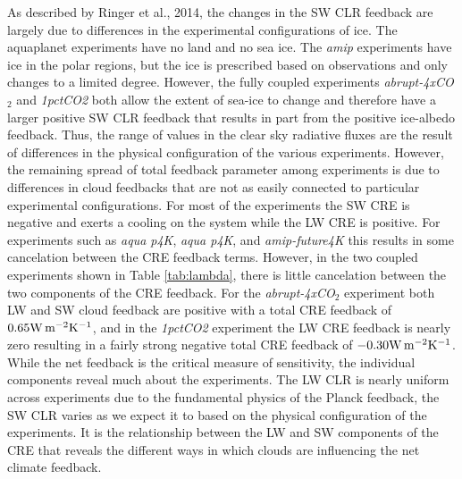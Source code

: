 \documentclass[draft]{agujournal2019}
\begin{document}
As described by Ringer et al., 2014, the changes in the SW CLR feedback are largely due to differences 
in the experimental configurations of ice.  The aquaplanet experiments have no land and no sea ice.  
The \textit{amip} experiments have ice in the polar regions, but the ice is prescribed based on observations and 
only changes to a limited degree.  However, the fully coupled experiments \textit{abrupt-4xCO$_2$} and 
\textit{1pctCO2} both allow the extent of sea-ice to change and therefore have a larger positive SW CLR
feedback that results in part from the positive ice-albedo feedback.  Thus, the range of values in the clear
sky radiative fluxes are the result of differences in the physical configuration of the various experiments.  
However, the remaining spread of total feedback parameter among experiments is due to differences
in cloud feedbacks that are not as easily connected to particular experimental configurations.  For 
most of the experiments the SW CRE is negative and exerts a cooling on the system while the 
LW CRE is positive.  For experiments such as \textit{aqua p4K}, \textit{aqua p4K}, and \textit{amip-future4K} 
this results in some cancelation between the CRE feedback terms.  However, in the 
two coupled experiments shown in Table \ref{tab:lambda}, there is little cancelation between
the two components of the CRE feedback.  For the
\textit{abrupt-4xCO$_2$} experiment both LW and SW cloud feedback are positive with a total 
CRE feedback of $0.65 \rm{W\, m^{-2} K^{-1}}$, and in the \textit{1pctCO2} experiment the LW 
CRE feedback is nearly zero 
resulting in a fairly strong  negative total CRE feedback of $-0.30 \rm{W\, m^{-2} K^{-1}}$.      
While the net feedback is the critical measure of sensitivity, the individual components 
reveal much about the experiments.  The LW CLR is nearly uniform across experiments 
due to the fundamental 
physics of the Planck feedback, the SW CLR varies as we expect it to based on the 
physical configuration of the experiments.  It is the relationship between the LW and SW 
components of the CRE that reveals the different ways in which clouds are influencing the 
net climate feedback.  
\end{document}
